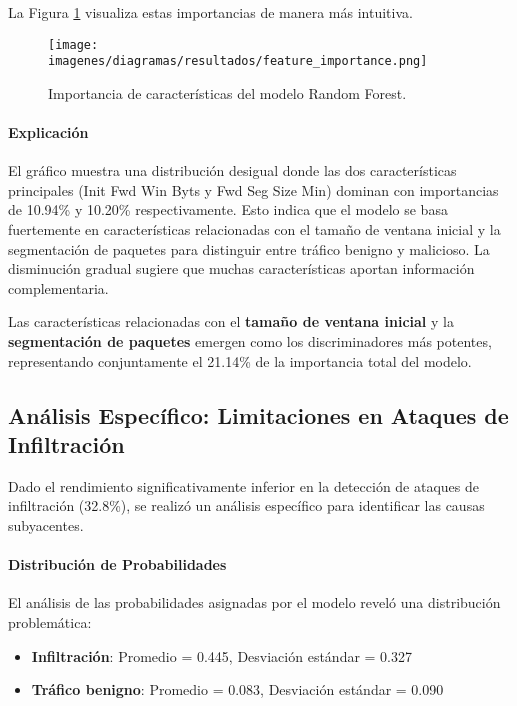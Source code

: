 La Figura \ref{fig:feature_importance} visualiza estas importancias de manera más intuitiva.

\begin{figure}[H]
\centering
\texttt{[image: imagenes/diagramas/resultados/feature\_importance.png]}
\caption{Importancia de características del modelo Random Forest.}
\label{fig:feature_importance}
\end{figure}

\paragraph{Explicación}
El gráfico muestra una distribución desigual donde las dos características principales (Init Fwd Win Byts y Fwd Seg Size Min) dominan con importancias de 10.94\% y 10.20\% respectivamente. Esto indica que el modelo se basa fuertemente en características relacionadas con el tamaño de ventana inicial y la segmentación de paquetes para distinguir entre tráfico benigno y malicioso. La disminución gradual sugiere que muchas características aportan información complementaria.

Las características relacionadas con el \textbf{tamaño de ventana inicial} y la \textbf{segmentación de paquetes} emergen como los discriminadores más potentes, representando conjuntamente el 21.14\% de la importancia total del modelo.

\subsection{Análisis Específico: Limitaciones en Ataques de Infiltración}

Dado el rendimiento significativamente inferior en la detección de ataques de infiltración (32.8\%), se realizó un análisis específico para identificar las causas subyacentes.

\paragraph{Distribución de Probabilidades}

El análisis de las probabilidades asignadas por el modelo reveló una distribución problemática:

\begin{itemize}
\item \textbf{Infiltración}: Promedio = 0.445, Desviación estándar = 0.327
\item \textbf{Tráfico benigno}: Promedio = 0.083, Desviación estándar = 0.090
\end{itemize}

